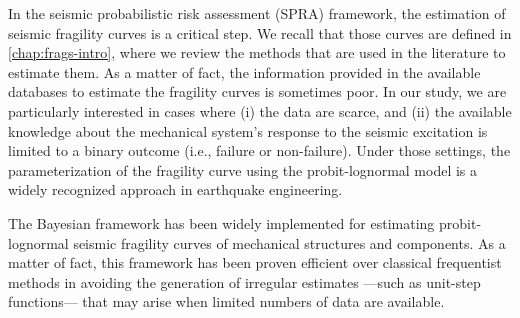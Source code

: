 In the seismic probabilistic risk assessment (SPRA) framework, the estimation of seismic fragility curves is a critical step. 
We recall that those curves are defined in   \cref{chap:frags-intro}, where we review the methods that are used in the literature to estimate them.
As a matter of fact, the information provided in the available databases to estimate the fragility curves is sometimes poor.
In our study, we are particularly interested in cases where
(i) the data are scarce, and (ii) the available knowledge about the mechanical system's response to the seismic excitation is limited to a binary outcome (i.e., failure or non-failure).
Under those settings, the parameterization of the fragility curve using the probit-lognormal model is a widely recognized approach in earthquake engineering.






The Bayesian framework has been widely implemented for estimating probit-lognormal seismic fragility curves of mechanical structures and components. %
As a matter of fact, this framework has been proven efficient over classical frequentist methods in avoiding the generation of irregular estimates ---such as unit-step functions--- that may arise when limited numbers of data are available.

